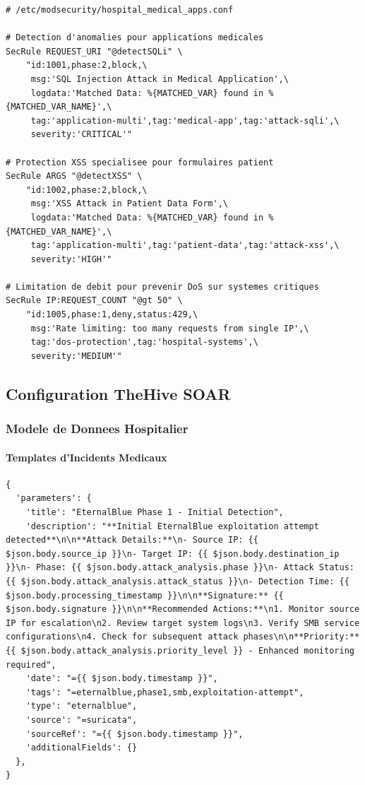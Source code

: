 \begin{lstlisting}[caption=Configuration ModSecurity pour applications medicales]
# /etc/modsecurity/hospital_medical_apps.conf

# Detection d'anomalies pour applications medicales
SecRule REQUEST_URI "@detectSQLi" \
    "id:1001,phase:2,block,\
     msg:'SQL Injection Attack in Medical Application',\
     logdata:'Matched Data: %{MATCHED_VAR} found in %{MATCHED_VAR_NAME}',\
     tag:'application-multi',tag:'medical-app',tag:'attack-sqli',\
     severity:'CRITICAL'"

# Protection XSS specialisee pour formulaires patient
SecRule ARGS "@detectXSS" \
    "id:1002,phase:2,block,\
     msg:'XSS Attack in Patient Data Form',\
     logdata:'Matched Data: %{MATCHED_VAR} found in %{MATCHED_VAR_NAME}',\
     tag:'application-multi',tag:'patient-data',tag:'attack-xss',\
     severity:'HIGH'"

# Limitation de debit pour prevenir DoS sur systemes critiques
SecRule IP:REQUEST_COUNT "@gt 50" \
    "id:1005,phase:1,deny,status:429,\
     msg:'Rate limiting: too many requests from single IP',\
     tag:'dos-protection',tag:'hospital-systems',\
     severity:'MEDIUM'"

\end{lstlisting}
\clearpage


\subsection{Configuration TheHive SOAR}

\subsubsection{Modele de Donnees Hospitalier}

\paragraph{Templates d'Incidents Medicaux}

\begin{lstlisting}[style=jsonstyle,caption=Template TheHive pour incident EternalBlue]
{
  'parameters': {
    'title': "EternalBlue Phase 1 - Initial Detection",
    'description': "**Initial EternalBlue exploitation attempt detected**\n\n**Attack Details:**\n- Source IP: {{ $json.body.source_ip }}\n- Target IP: {{ $json.body.destination_ip }}\n- Phase: {{ $json.body.attack_analysis.phase }}\n- Attack Status: {{ $json.body.attack_analysis.attack_status }}\n- Detection Time: {{ $json.body.processing_timestamp }}\n\n**Signature:** {{ $json.body.signature }}\n\n**Recommended Actions:**\n1. Monitor source IP for escalation\n2. Review target system logs\n3. Verify SMB service configurations\n4. Check for subsequent attack phases\n\n**Priority:** {{ $json.body.attack_analysis.priority_level }} - Enhanced monitoring required",
    'date': "={{ $json.body.timestamp }}",
    'tags': "=eternalblue,phase1,smb,exploitation-attempt",
    'type': "eternalblue",
    'source': "=suricata",
    'sourceRef': "={{ $json.body.timestamp }}",
    'additionalFields': {}
  },
}
\end{lstlisting}


